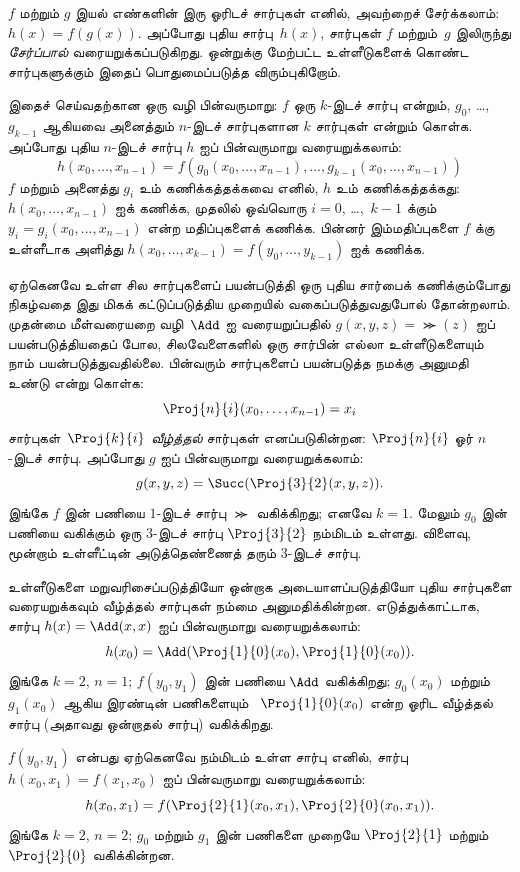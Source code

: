 \documentclass[../../../include/open-logic-section]{subfiles}
\begin{document}


$f$ மற்றும் $g$ இயல் எண்களின் இரு ஓரிடச் சார்புகள் எனில்,
அவற்றைச் சேர்க்கலாம்: $h(x) = f(g(x))$. அப்போது புதிய
சார்பு~$h(x)$, சார்புகள் $f$ மற்றும்~$g$ இலிருந்து
\emph{சேர்ப்பால்} வரையறுக்கப்படுகிறது. ஒன்றுக்கு மேற்பட்ட
உள்ளீடுகளைக் கொண்ட சார்புகளுக்கும் இதைப் பொதுமைப்படுத்த விரும்புகிறோம்.

இதைச் செய்வதற்கான ஒரு வழி பின்வருமாறு: $f$ ஒரு $k$-இடச் சார்பு
என்றும், $g_0$, \dots, $g_{k-1}$ ஆகியவை அனைத்தும் $n$-இடச்
சார்புகளான $k$ சார்புகள் என்றும் கொள்க. அப்போது புதிய $n$-இடச்
சார்பு $h$ ஐப் பின்வருமாறு வரையறுக்கலாம்:
\[
h(x_0, \dots, x_{n-1}) =
f(g_0(x_0, \dots, x_{n-1}), \dots, g_{k-1}(x_0, \dots, x_{n-1}))
\]
$f$ மற்றும் அனைத்து $g_i$ உம் கணிக்கத்தக்கவை எனில், $h$ உம்
கணிக்கத்தக்கது: $h(x_0, \dots, x_{n-1})$ ஐக் கணிக்க, முதலில்
ஒவ்வொரு $i = 0$, \dots,~$k-1$ க்கும் $y_i = g_i(x_0, \dots,
x_{n-1})$ என்ற மதிப்புகளைக் கணிக்க. பின்னர் இம்மதிப்புகளை $f$ க்கு
உள்ளீடாக அளித்து $h(x_0, \dots, x_{k-1}) = f(y_0, \dots, y_{k-1})$
ஐக் கணிக்க.

ஏற்கெனவே உள்ள சில சார்புகளைப் பயன்படுத்தி ஒரு புதிய சார்பைக்
கணிக்கும்போது நிகழ்வதை இது மிகக் கட்டுப்படுத்திய முறையில்
வகைப்படுத்துவதுபோல் தோன்றலாம். முதன்மை மீள்வரையறை வழி~$\Add$ ஐ
வரையறுப்பதில் $g(x, y, z) = \Succ(z)$ ஐப் பயன்படுத்தியதைப் போல,
சிலவேளைகளில் ஒரு சார்பின் எல்லா உள்ளீடுகளையும் நாம் பயன்படுத்துவதில்லை.
பின்வரும் சார்புகளைப் பயன்படுத்த நமக்கு அனுமதி உண்டு என்று கொள்க:
\[
\Proj{n}{i}(x_0, \dots, x_{n-1}) = x_i
\]
சார்புகள்~$\Proj{k}{i}$ \emph{வீழ்த்தல்} சார்புகள் எனப்படுகின்றன:
$\Proj{n}{i}$ ஓர் $n$-இடச் சார்பு. அப்போது $g$ ஐப் பின்வருமாறு
வரையறுக்கலாம்:
\[
g(x, y, z) = \Succ(\Proj{3}{2}(x, y, z)).
\]
இங்கே $f$ இன் பணியை $1$-இடச் சார்பு $\Succ$ வகிக்கிறது; எனவே
$k=1$. மேலும் $g_0$ இன் பணியை வகிக்கும் ஒரு $3$-இடச் சார்பு
$\Proj{3}{2}$ நம்மிடம் உள்ளது. விளைவு, மூன்றாம் உள்ளீட்டின்
அடுத்தெண்ணைத் தரும் $3$-இடச் சார்பு.

உள்ளீடுகளை மறுவரிசைப்படுத்தியோ ஒன்றாக அடையாளப்படுத்தியோ புதிய
சார்புகளை வரையறுக்கவும் வீழ்த்தல் சார்புகள் நம்மை அனுமதிக்கின்றன.
எடுத்துக்காட்டாக, சார்பு $h(x) = \Add(x, x)$ ஐப் பின்வருமாறு
வரையறுக்கலாம்:
\[
h(x_0) = \Add(\Proj{1}{0}(x_0),\Proj{1}{0}(x_0)).
\]
இங்கே $k=2$, $n=1$; $f(y_0,y_1)$ இன் பணியை $\Add$ வகிக்கிறது;
$g_0(x_0)$ மற்றும் $g_1(x_0)$ ஆகிய இரண்டின் பணிகளையும்
~$\Proj{1}{0}(x_0)$ என்ற ஓரிட வீழ்த்தல் சார்பு (அதாவது ஒன்றாதல்
சார்பு) வகிக்கிறது.

$f(y_0, y_1)$ என்பது ஏற்கெனவே நம்மிடம் உள்ள சார்பு எனில்,
சார்பு $h(x_0, x_1) = f(x_1, x_0)$ ஐப் பின்வருமாறு வரையறுக்கலாம்:
\[
h(x_0, x_1) = f(\Proj{2}{1}(x_0, x_1),\Proj{2}{0}(x_0, x_1)).
\]
இங்கே $k=2$, $n = 2$; $g_0$ மற்றும் $g_1$ இன் பணிகளை முறையே
$\Proj{2}{1}$ மற்றும்~$\Proj{2}{0}$ வகிக்கின்றன.
\end{document}
